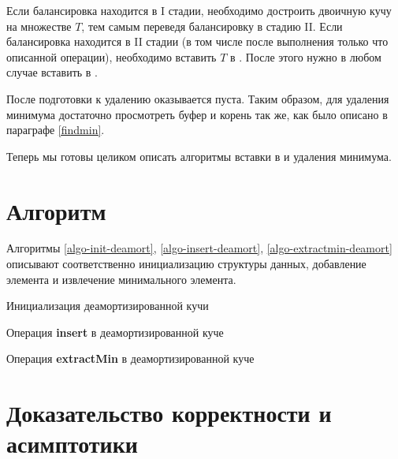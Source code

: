 Если балансировка находится в I стадии, необходимо достроить двоичную кучу на множестве
$T$, тем самым переведя балансировку в стадию II.  
Если балансировка находится в II стадии (в том числе после выполнения только что
описанной операции), необходимо вставить $T$ в \HH. После этого нужно в любом
случае вставить \MH в \HH.

После подготовки к удалению \MH оказывается пуста. Таким образом, для удаления
минимума достаточно просмотреть буфер и корень \HH так же,
как было описано в параграфе \ref{findmin}.

Теперь мы готовы целиком описать алгоритмы вставки в \SCH и удаления минимума.

\section{Алгоритм}
Алгоритмы \ref{algo-init-deamort}, \ref{algo-insert-deamort}, \ref{algo-extractmin-deamort}
описывают соответственно инициализацию структуры данных, добавление элемента и извлечение
минимального элемента.

\begin{algorithm}[t]
\DefineAlgoKeywords
{}
\caption{Инициализация деамортизированной кучи}
\label{algo-init-deamort}
\end{algorithm}

\begin{algorithm}[p]
\DefineAlgoKeywords
 \KwData{$\x \in \myX$}
 \caption{Операция \textbf{insert} в деамортизированной куче}
 \label{algo-insert-deamort}
\end{algorithm}

\begin{algorithm}[p]
\DefineAlgoKeywords
 \caption{Операция \textbf{extractMin} в деамортизированной куче}
 \label{algo-extractmin-deamort}
\end{algorithm}

\section{Доказательство корректности и асимптотики} \label{proof-simple}

